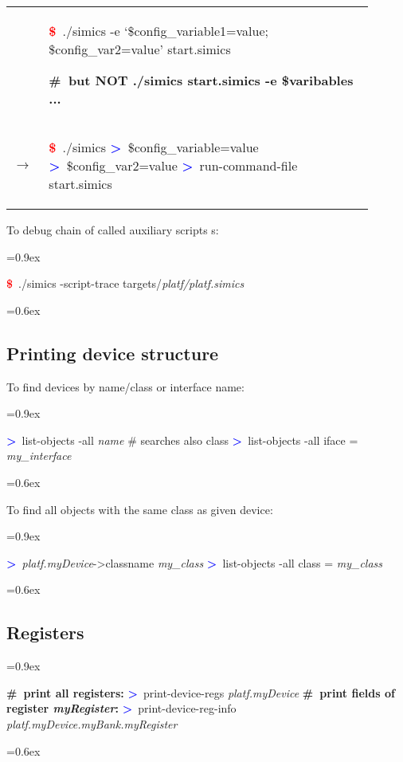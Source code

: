 \documentclass[8pt]{extarticle}
\newenvironment{code}[1][]{%
\begin{prebox}[#1]\obeylines%
\fontdimen2\font=0.9ex%
}{%
\end{prebox}%
\fontdimen2\font=0.6ex%
}
\newenvironment{codem}[1][\linewidth]{%
\begin{minipage}{#1}%
\begin{prebox}\obeylines}{%
\end{prebox}%
\end{minipage}}
\newenvironment{code9}{\begin{codem}[0.9\linewidth]}{\end{codem}}
\newcommand{\cod}[1]{\tcbox[
    size=fbox,
    on line,
    colback=green!15,
    colframe=black,
    arc=0.3em  %
]{#1}}
\newcommand{\ind}{\hphantom{~~~}}
\newcommand{\prompt}{\textcolor{red}{\textbf{\$}\ }}
\newcommand{\sprompt}{\textcolor{blue}{\textbf{>}\ }}
\newcommand{\cmtcommon}[1]{\textcolor{Sepia}{\textbf{#1}}}
\newcommand{\cmt}[1]{\cmtcommon{\#\ #1}}
\newcommand{\p}[1]{\textit{\large#1}}
\begin{document}
\begin{multicols*}{3}
\begin{tabular}{lp{0.9\linewidth}}
        & \begin{code9}
            \prompt ./simics -e ‘\$config\_variable1=value; \$config\_var2=value’ start.simics

            \cmt{but NOT ./simics start.simics -e \$varibables ...}
        \end{code9}
        \vspace{0.05cm}
        \\
        $\longrightarrow$ &
        \begin{code9}
            \prompt ./simics
            \sprompt \$config\_variable=value
            \sprompt \$config\_var2=value
            \sprompt run-command-file start.simics
        \end{code9}
    \end{tabular}


    To debug chain of called auxiliary scripts \cod{include}s:
    \begin{code}
        \prompt ./simics -script-trace targets/\p{platf/platf.simics}
    \end{code}

\subsection{Printing device structure}
To find devices by name/class or interface name:
    \begin{code}
        \sprompt list-objects -all \p{name} \ind \# searches also class
        \sprompt list-objects -all iface = \p{my\_interface}
    \end{code}

To find all objects with the same class as given device:
        \begin{code}
            \sprompt \p{platf.myDevice}->classname
            \p{my\_class}
            \sprompt list-objects -all class = \p{my\_class}
        \end{code}

\subsection{Registers}
\begin{code}
    \cmt{print all registers:}
    \sprompt print-device-regs \p{platf.myDevice}
    \cmt{print fields of register \p{myRegister}:}
    \sprompt print-device-reg-info \p{platf.myDevice.myBank.myRegister}
\end{code}


\end{multicols*}
\end{document}
